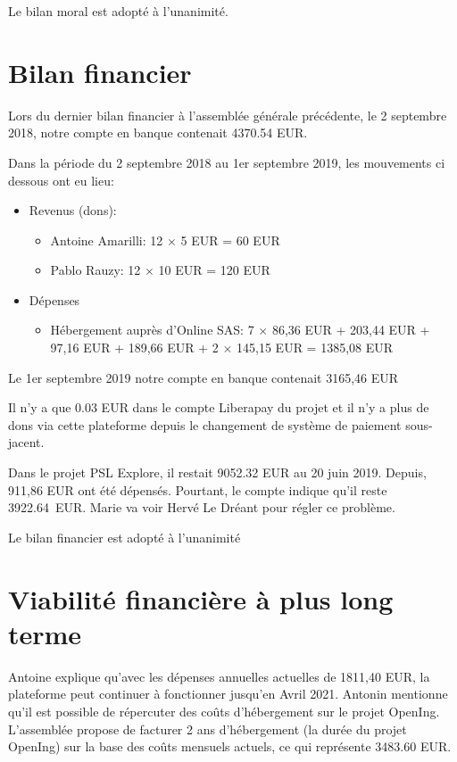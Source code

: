 \documentclass[a4paper]{article}
\begin{document}
Le bilan moral est adopté à l'unanimité.

\section{Bilan financier}

Lors du dernier bilan financier à l'assemblée générale précédente, le 2 septembre 2018, notre compte en banque contenait 4370.54 EUR.

Dans la période du 2 septembre 2018 au 1er septembre 2019, les mouvements ci dessous ont eu lieu:

\begin{itemize}
  \item Revenus (dons):
    \begin{itemize}
      \item Antoine Amarilli: 12 $\times$ 5 EUR = 60 EUR
      \item Pablo Rauzy: 12 $\times$ 10 EUR = 120 EUR
    \end{itemize}
   \item Dépenses
     \begin{itemize}
       \item Hébergement auprès d'Online SAS:  7 $\times$ 86,36 EUR + 203,44 EUR + 97,16 EUR + 189,66 EUR + 2 $\times$ 145,15 EUR = 1385,08 EUR
     \end{itemize}
\end{itemize}
    
Le 1er septembre 2019 notre compte en banque contenait 3165,46 EUR

Il n'y a que 0.03 EUR dans le compte Liberapay du projet et il n'y a plus de dons
via cette plateforme depuis le changement de système de paiement sous-jacent.

Dans le projet PSL Explore, il restait 9052.32 EUR au 20 juin 2019. Depuis, 911,86 EUR ont été dépensés. Pourtant, le compte indique qu'il reste 3922.64~EUR. Marie va voir Hervé Le Dréant pour régler ce problème.

Le bilan financier est adopté à l'unanimité

\section{Viabilité financière à plus long terme}

Antoine explique qu'avec les dépenses annuelles actuelles de 1811,40 EUR, la plateforme peut continuer à fonctionner jusqu'en Avril 2021.
Antonin mentionne qu'il est possible de répercuter des coûts d'hébergement sur le projet OpenIng. L'assemblée propose de facturer 2 ans d'hébergement (la durée du projet OpenIng) sur la base des coûts mensuels actuels, ce qui représente 3483.60 EUR.
\end{document}
